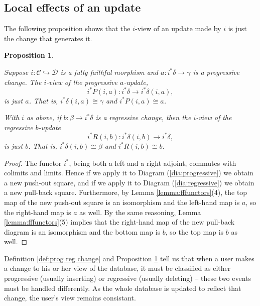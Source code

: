 \documentclass{amsart}
\def\mc{\mathcal}
\def\to{\rightarrow}
\def\taking{\colon}
\def\inj{\hookrightarrow}
\def\iso{\cong}
\def\mcC{\mc{C}}
\def\mcD{\mc{D}}
\newtheorem{proposition}[theorem]{Proposition}
\theoremstyle{remark}
\theoremstyle{definition}
\begin{document}
\subsection{Local effects of an update}\label{subsec:local effects}

The following proposition shows that the $i$-view of an update made by $i$ is just the change that generates it.

\begin{proposition}\label{prop:good local effects}

Suppose $i\taking\mcC\inj\mcD$ is a fully faithful morphism and $a\taking i^*\delta\to\gamma$ is a progressive change.  The $i$-view of the progressive $a$-update, $$i^*P(i,a)\taking i^*\delta\to i^*\delta(i,a),$$ is just $a$.  That is, $i^*\delta(i,a)\iso\gamma$ and $i^*P(i,a)\iso a$.

With $i$ as above, if $b\taking\beta\to i^*\delta$ is a regressive change, then the $i$-view of the regressive $b$-update $$i^*R(i,b)\taking i^*\delta(i,b)\to i^*\delta,$$ is just $b$.  That is, $i^*\delta(i,b)\iso\beta$ and $i^*R(i,b)\iso b$.

\end{proposition}

\begin{proof}

The functor $i^*$, being both a left and a right adjoint, commutes with colimits and limits.  Hence if we apply it to Diagram (\ref{dia:progressive}) we obtain a new push-out square, and if we apply it to Diagram (\ref{dia:regressive}) we obtain a new pull-back square.  Furthermore, by Lemma \ref{lemma:fffunctors}(4), the top map of the new push-out square is an isomorphism and the left-hand map is $a$, so the right-hand map is $a$ as well.  By the same reasoning, Lemma \ref{lemma:fffunctors}(5) implies that the right-hand map of the new pull-back diagram is an isomorphism and the bottom map is $b$, so the top map is $b$ as well.  

\end{proof}

Definition \ref{def:prog reg change} and Proposition \ref{prop:good local effects} tell us that when a user makes a change to his or her view of the database, it must be classified as either progressive (usually inserting) or regressive (usually deleting) -- these two events must be handled differently.  As the whole database is updated to reflect that change, the user's view remains consistant.
\end{document}
